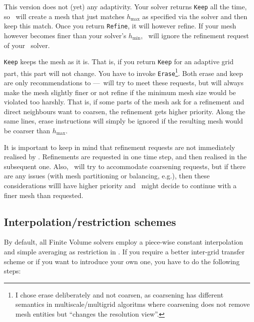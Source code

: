 \noindent
This version does not (yet) any adaptivity. 
Your solver returns \texttt{Keep} all the time, so \Peano\ will create a mesh
that just matches $h_{\text{max}}$ as specified via the solver and then keep
this match.
Once you return \texttt{Refine}, it will however refine.
If your mesh however becomes finer than your solver's $h_{\text{min}}$, \Peano\
will ignore the refinement request of your \ExaHyPE\ solver.


\texttt{Keep} keeps the mesh as it is.
That is, if you return \texttt{Keep} for an adaptive grid part, this part will
not change.
You have to invoke \texttt{Erase}\footnote{I chose erase deliberately and not
coarsen, as coarsening has different semantics in multiscale/multigrid
algoritms where coarsening does not remove mesh entities but ``changes the
resolution view''.}.
Both erase and keep are only recommendations to \Peano---\Peano\ will try to
meet these requests, but will always make the mesh slightly finer or not refine
if the minimum mesh size would be violated too harshly.
That is, if some parts of the mesh ask for a refinement and direct neighbours
want to coarsen, the refinement gets higher priority.
Along the same lines, erase instructions will simply be ignored if the resulting
mesh would be coarser than $h_{\text{max}}$.


\begin{remark}
It is important to keep in mind that refinement requests are not
immediately realised by \Peano. 
Refinements are requested in one time step, and then realised in the subsequent
one.
Also, \Peano\ will try to accommodate coarsening requests, but if there are any issues (with mesh partitioning or balancing, e.g.), then these
considerations willl have higher priority and \Peano\ might decide to continue with a finer mesh than requested.
\end{remark}



\subsection{Interpolation/restriction schemes}

By default, all Finite Volume solvers employ a piece-wise constant interpolation and simple averaging as restriction in 
\ExaHyPE.
If you require a better inter-grid transfer scheme or if you want to introduce your own one, you have to do the following steps:

